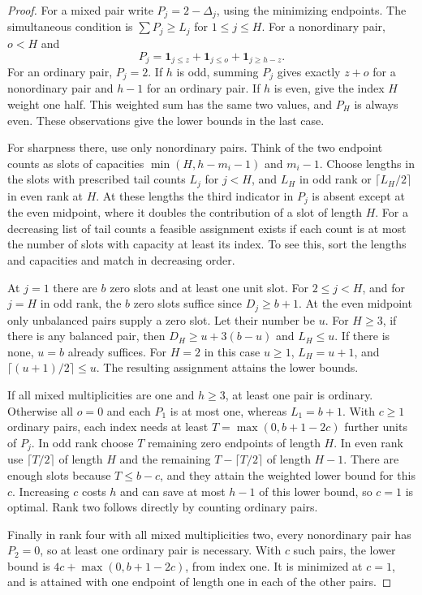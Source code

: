 \begin{proof}
For a mixed pair write \(P_j=2-\Delta_j\), using the minimizing
endpoints. The simultaneous condition is
\(\sum P_j\ge L_j\) for \(1\le j\le H\).
For a nonordinary pair, \(o<H\) and
\[
 P_j=\mathbf 1_{j\le z}+\mathbf 1_{j\le o}
             +\mathbf 1_{j\ge h-z}.
\]
For an ordinary pair, \(P_j=2\).
If \(h\) is odd, summing \(P_j\) gives exactly \(z+o\) for a
nonordinary pair and \(h-1\) for an ordinary pair. If \(h\) is even,
give the index \(H\) weight one half. This weighted sum has the
same two values, and \(P_H\) is always even.
These observations give the lower bounds in the last case.

For sharpness there, use only nonordinary pairs. Think of the two
endpoint counts as slots of capacities
\(\min(H,h-m_i-1)\) and \(m_i-1\).
Choose lengths in the slots with prescribed tail counts \(L_j\)
for \(j<H\), and \(L_H\) in odd rank or \(\lceil L_H/2\rceil\)
in even rank at \(H\). At these lengths the third indicator in
\(P_j\) is absent except at the even midpoint, where it doubles
the contribution of a slot of length \(H\).
For a decreasing list of tail counts a feasible assignment
exists if each count is at most the number of slots with capacity
at least its index. To see this, sort the lengths and capacities
and match in decreasing order.

At \(j=1\) there are \(b\) zero slots and at least one unit slot.
For \(2\le j<H\), and for \(j=H\) in odd rank, the \(b\)
zero slots suffice since \(D_j\ge b+1\).
At the even midpoint only unbalanced pairs supply a zero slot.
Let their number be \(u\). For \(H\ge3\), if there is any
balanced pair, then \(D_H\ge u+3(b-u)\) and \(L_H\le u\).
If there is none, \(u=b\) already suffices. For \(H=2\) in
this case \(u\ge1\), \(L_H=u+1\), and
\(\lceil(u+1)/2\rceil\le u\). The resulting assignment
attains the lower bounds.

If all mixed multiplicities are one and \(h\ge3\), at least
one pair is ordinary. Otherwise all \(o=0\) and each \(P_1\)
is at most one, whereas \(L_1=b+1\).
With \(c\ge1\) ordinary pairs, each index needs at least
\(T=\max(0,b+1-2c)\) further units of \(P_j\).
In odd rank choose \(T\) remaining zero endpoints of length \(H\).
In even rank use \(\lceil T/2\rceil\) of length \(H\) and the
remaining \(T-\lceil T/2\rceil\) of length \(H-1\).
There are enough slots because \(T\le b-c\), and they attain
the weighted lower bound for this \(c\). Increasing \(c\) costs
\(h\) and can save at most \(h-1\) of this lower bound, so
\(c=1\) is optimal. Rank two follows directly by counting
ordinary pairs.

Finally in rank four with all mixed multiplicities two,
every nonordinary pair has \(P_2=0\), so at least one
ordinary pair is necessary. With \(c\) such pairs,
the lower bound is \(4c+\max(0,b+1-2c)\), from index one.
It is minimized at \(c=1\), and is attained with one endpoint
of length one in each of the other pairs.
\end{proof}

